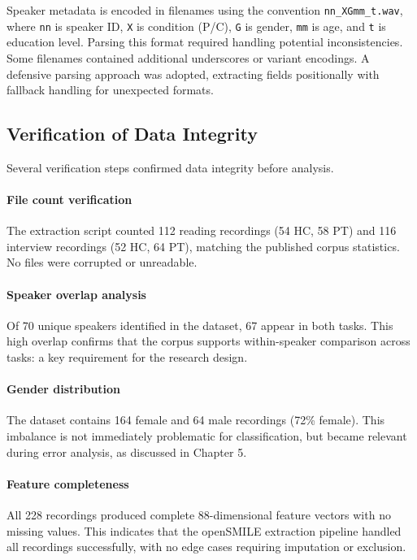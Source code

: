 Speaker metadata is encoded in filenames using the convention \texttt{nn\_XGmm\_t.wav}, where \texttt{nn} is speaker ID, \texttt{X} is condition (P/C), \texttt{G} is gender, \texttt{mm} is age, and \texttt{t} is education level. Parsing this format required handling potential inconsistencies. Some filenames contained additional underscores or variant encodings. A defensive parsing approach was adopted, extracting fields positionally with fallback handling for unexpected formats.

\subsection{Verification of Data Integrity}

Several verification steps confirmed data integrity before analysis.

\paragraph{File count verification} The extraction script counted 112 reading recordings (54 HC, 58 PT) and 116 interview recordings (52 HC, 64 PT), matching the published corpus statistics. No files were corrupted or unreadable.

\paragraph{Speaker overlap analysis} Of 70 unique speakers identified in the dataset, 67 appear in both tasks. This high overlap confirms that the corpus supports within-speaker comparison across tasks: a key requirement for the research design.

\paragraph{Gender distribution} The dataset contains 164 female and 64 male recordings (72\% female). This imbalance is not immediately problematic for classification, but became relevant during error analysis, as discussed in Chapter 5.

\paragraph{Feature completeness} All 228 recordings produced complete 88-dimensional feature vectors with no missing values. This indicates that the openSMILE extraction pipeline handled all recordings successfully, with no edge cases requiring imputation or exclusion.

